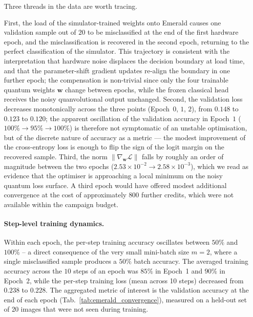 Three threads in the data are worth tracing.

First, the load of the simulator-trained weights onto Emerald causes one validation sample out of $20$ to be misclassified at the end of the first hardware epoch, and the misclassification is recovered in the second epoch, returning to the perfect classification of the simulator. This trajectory is consistent with the interpretation that hardware noise displaces the decision boundary at load time, and that the parameter-shift gradient updates re-align the boundary in one further epoch; the compensation is non-trivial since only the four trainable quantum weights $\boldsymbol{w}$ change between epochs, while the frozen classical head receives the noisy quanvolutional output unchanged. Second, the validation loss decreases monotonically across the three points (Epoch~$0$, $1$, $2$), from $0.148$ to $0.123$ to $0.120$; the apparent oscillation of the validation accuracy in Epoch~$1$ ($100\%\to 95\%\to 100\%$) is therefore not symptomatic of an unstable optimisation, but of the discrete nature of accuracy as a metric — the modest improvement of the cross-entropy loss is enough to flip the sign of the logit margin on the recovered sample. Third, the norm $\|\nabla_{\boldsymbol{w}}\mathcal{L}\|$ falls by roughly an order of magnitude between the two epochs ($2.53\times 10^{-2}\!\to\!2.58\times 10^{-3}$), which we read as evidence that the optimiser is approaching a local minimum on the noisy quantum loss surface. A third epoch would have offered modest additional convergence at the cost of approximately $800$ further credits, which were not available within the campaign budget.

\paragraph{Step-level training dynamics.}
Within each epoch, the per-step training accuracy oscillates between $50\%$ and $100\%$ -- a direct consequence of the very small mini-batch size $m=2$, where a single misclassified sample produces a $50\%$ batch accuracy. The averaged training accuracy across the $10$ steps of an epoch was $85\%$ in Epoch~1 and $90\%$ in Epoch~2, while the per-step training loss (mean across 10 steps) decreased from $0.238$ to $0.228$. The aggregated metric of interest is the validation accuracy at the end of each epoch (Tab.~\ref{tab:emerald_convergence}), measured on a held-out set of 20 images that were not seen during training.

